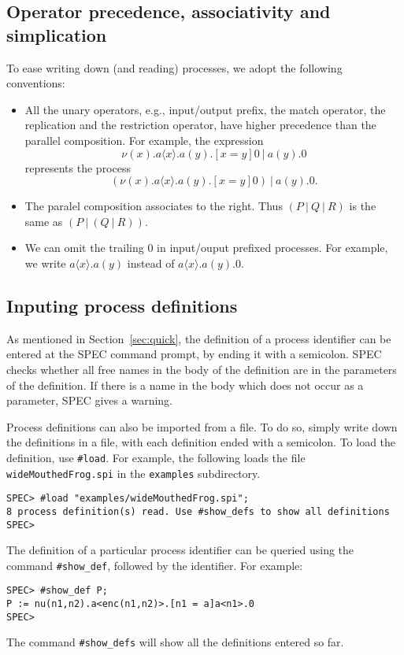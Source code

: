 \documentclass{article}
\begin{document}
\subsection{Operator precedence, associativity and simplication}

To ease writing down (and reading) processes, we adopt the following conventions:
\begin{itemize}
\item All the unary operators, e.g., input/output prefix, the match operator, the replication
and the restriction operator, have higher precedence than the parallel composition.
For example, the expression
$$
\nu (x). a\langle x \rangle. a(y).[x=y]0 ~ | ~ a(y).0
$$
represents the process
$$
(\nu (x). a\langle x \rangle. a(y).[x=y]0) ~ | ~ a(y).0.
$$
\item The paralel composition associates to the right. Thus $(P ~|~ Q ~|~ R)$ is
the same as $(P~|~ (Q~|~ R)).$

\item We can omit the trailing $0$ in input/ouput prefixed processes.
For example, we write $a\langle x \rangle.a(y)$ instead of 
$a\langle x \rangle.a(y).0$.
\end{itemize}

\subsection{Inputing process definitions}

As mentioned in Section~\ref{sec:quick}, the definition of a process identifier can be entered at the SPEC
command prompt, by ending it with a semicolon.
SPEC checks whether all free names in the body of the definition are in the
parameters of the definition. If there is a name in the body which does not occur as a parameter, SPEC
gives a warning. 

Process definitions can also be imported from a file. 
To do so, simply write down the definitions in a file, with each definition ended with a semicolon.
To load the definition, use \texttt{\#load}. For example, the following loads the
file \texttt{wideMouthedFrog.spi} in the \texttt{examples} subdirectory. 
\begin{verbatim}
SPEC> #load "examples/wideMouthedFrog.spi";
8 process definition(s) read. Use #show_defs to show all definitions
SPEC> 
\end{verbatim}
The definition of a particular process identifier can be queried using
the command \texttt{\#show\_def}, followed by the identifier.
For example:
\begin{verbatim}
SPEC> #show_def P;
P := nu(n1,n2).a<enc(n1,n2)>.[n1 = a]a<n1>.0
SPEC> 
\end{verbatim}
The command \texttt{\#show\_defs} will show all the definitions entered so far. 
\end{document}
